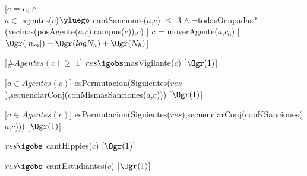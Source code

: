 \begin{Interfaz}
	[$c$ = $c_0 \land$\\
	$a \in$ agentes($c$)$\yluego$ cantSanciones($a$,$c$) $\leq$ 3 $\land$ $\neg$todasOcupadas?(vecinos(posAgente($a$,$c$),campus($c$)),$c$) ]
	{$c$ = moverAgente($a$,$c_0$)}
	[$\Ogr(|n_m|) + \Ogr(log N_a) + \Ogr(N_h)$]
	
	[$\#Agentes(c) \geq$ 1]
	{$res \igobs$masVigilante($c$)}
	[$\Ogr(1)$]

	[$a \in Agentes(c)$]
	{esPermutacion(Siguientes($res$),secuenciarConj(conMismasSanciones($a$,$c$)))}
	[$\Ogr(1)$]
	
	[$a \in Agentes(c)$]
	{esPermutacion(Siguientes($res$),secuenciarConj(conKSanciones($a$,$c$)))}
	[$\Ogr(1)$]
	
	{$res \igobs$ cantHippies($c$)}
	[$\Ogr(1)$]

	{$res \igobs$ cantEstudiantes($c$)}
	[$\Ogr(1)$]	
	
\end{Interfaz}

